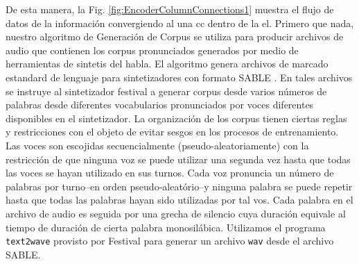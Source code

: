{De esta manera, la Fig. \ref{fig:EncoderColumnConnections1} muestra el flujo de datos de la información convergiendo al una \gls{cc} dentro de la \gls{el}.
Primero que nada, nuestro algoritmo de Generación de Corpus se utiliza para producir archivos de audio que contienen los corpus pronunciados generados por medio de herramientas de sintetis del habla.
El algoritmo genera archivos de marcado estandard de lenguaje para sintetizadores con formato SABLE \cite{sable}.
En tales archivos se instruye al sintetizador \gls{festival} a generar corpus desde varios números de palabras desde diferentes vocabularios pronunciados por voces diferentes disponibles en el sintetizador. 
La organización de los corpus tienen ciertas reglas y restricciones con el objeto de evitar sesgos en los procesos de entrenamiento.
Las voces son escojidas secuencialmente (pseudo-aleatoriamente) con la restricción de que ninguna voz se puede utilizar una segunda vez hasta que todas las voces se hayan utilizado en sus turnos.
Cada voz pronuncia un número de palabras por turno--en orden pseudo-aleatório--y ninguna palabra se puede repetir hasta que todas las palabras hayan sido utilizadas por tal vos.
Cada palabra en el archivo de audio es seguida por una grecha de silencio cuya duración equivale al tiempo de duración de cierta palabra monosilábica.
Utilizamos el programa \texttt{text2wave} provisto por Festival para generar un archivo \texttt{wav} desde el archivo SABLE.

}
